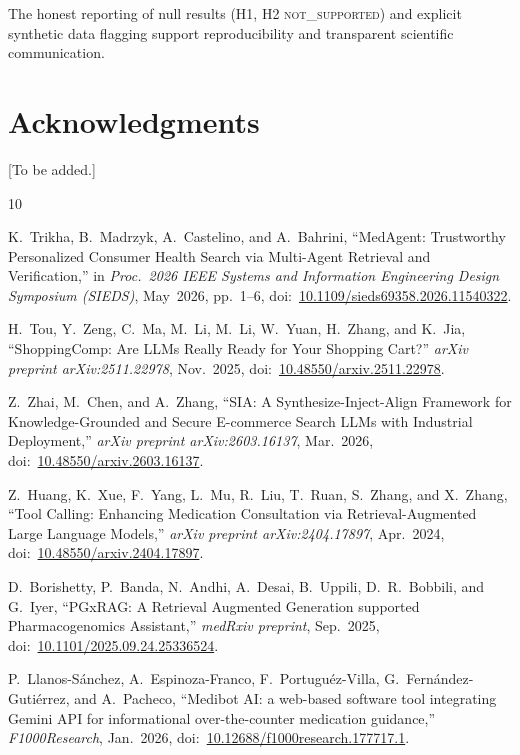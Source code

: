 \documentclass[conference]{IEEEtran}
\begin{document}
The honest reporting of null results (H1, H2 \textsc{not\_supported}) and
explicit synthetic data flagging support reproducibility and transparent
scientific communication.

\section*{Acknowledgments}

[To be added.]

\begin{thebibliography}{10}

K.~Trikha, B.~Madrzyk, A.~Castelino, and A.~Bahrini,
``MedAgent: Trustworthy Personalized Consumer Health Search via Multi-Agent
Retrieval and Verification,''
in \textit{Proc.\ 2026 IEEE Systems and Information Engineering Design Symposium
(SIEDS)}, May~2026, pp.~1--6,
doi:~\href{https://doi.org/10.1109/sieds69358.2026.11540322}{10.1109/sieds69358.2026.11540322}.

H.~Tou, Y.~Zeng, C.~Ma, M.~Li, M.~Li, W.~Yuan, H.~Zhang, and K.~Jia,
``ShoppingComp: Are LLMs Really Ready for Your Shopping Cart?''
\textit{arXiv preprint arXiv:2511.22978}, Nov.~2025,
doi:~\href{https://doi.org/10.48550/arxiv.2511.22978}{10.48550/arxiv.2511.22978}.

Z.~Zhai, M.~Chen, and A.~Zhang,
``SIA: A Synthesize-Inject-Align Framework for Knowledge-Grounded and Secure
E-commerce Search LLMs with Industrial Deployment,''
\textit{arXiv preprint arXiv:2603.16137}, Mar.~2026,
doi:~\href{https://doi.org/10.48550/arxiv.2603.16137}{10.48550/arxiv.2603.16137}.

Z.~Huang, K.~Xue, F.~Yang, L.~Mu, R.~Liu, T.~Ruan, S.~Zhang, and X.~Zhang,
``Tool Calling: Enhancing Medication Consultation via Retrieval-Augmented Large
Language Models,''
\textit{arXiv preprint arXiv:2404.17897}, Apr.~2024,
doi:~\href{https://doi.org/10.48550/arxiv.2404.17897}{10.48550/arxiv.2404.17897}.

D.~Borishetty, P.~Banda, N.~Andhi, A.~Desai, B.~Uppili, D.~R.~Bobbili,
and G.~Iyer,
``PGxRAG: A Retrieval Augmented Generation supported Pharmacogenomics
Assistant,''
\textit{medRxiv preprint}, Sep.~2025,
doi:~\href{https://doi.org/10.1101/2025.09.24.25336524}{10.1101/2025.09.24.25336524}.

P.~Llanos-S\'{a}nchez, A.~Espinoza-Franco, F.~Portugu\'{e}z-Villa,
G.~Fern\'{a}ndez-Guti\'{e}rrez, and A.~Pacheco,
``Medibot AI: a web-based software tool integrating Gemini API for informational
over-the-counter medication guidance,''
\textit{F1000Research}, Jan.~2026,
doi:~\href{https://doi.org/10.12688/f1000research.177717.1}{10.12688/f1000research.177717.1}.


\end{thebibliography}
\end{document}
